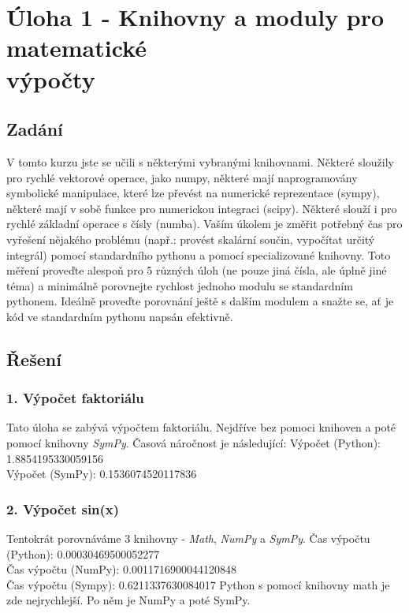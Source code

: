 \documentclass[a4paper,12pt]{article}
\begin{document}
	\section {Úloha 1 - Knihovny a moduly pro matematické\\ výpočty}
	\subsection{Zadání}
V tomto kurzu jste se učili s některými vybranými knihovnami. Některé sloužily pro rychlé vektorové operace, jako numpy, některé mají naprogramovány symbolické manipulace, které lze převést na numerické reprezentace (sympy), některé mají v sobě funkce pro numerickou integraci (scipy). Některé slouží i pro rychlé základní operace s čísly (numba).
\justify
Vaším úkolem je změřit potřebný čas pro vyřešení nějakého problému (např.: provést skalární součin, vypočítat určitý integrál) pomocí standardního pythonu a pomocí specializované knihovny. Toto měření proveďte alespoň pro 5 různých úloh (ne pouze jiná čísla, ale úplně jiné téma) a minimálně porovnejte rychlost jednoho modulu se standardním pythonem. Ideálně proveďte porovnání ještě s dalším modulem a snažte se, ať je kód ve standardním pythonu napsán efektivně.  



\subsection{Řešení}
\subsubsection{1. Výpočet faktoriálu}
Tato úloha se zabývá výpočtem faktoriálu. Nejdříve bez pomoci knihoven a poté pomocí
knihovny \textit{SymPy}. Časová náročnost je následující:
\justify
Výpočet (Python):  1.8854195330059156\\
Výpočet (SymPy):  0.1536074520117836
\\
\subsubsection{2. Výpočet sin(x)}
Tentokrát porovnáváme 3 knihovny - \textit{Math}, \textit{NumPy} a \textit{SymPy}.
\justify
Čas výpočtu (Python):  0.00030469500052277\\
Čas výpočtu (NumPy):   0.0011716900044120848\\
Čas výpočtu (Sympy):   0.6211337630084017
\justify
Python s pomocí knihovny math je zde nejrychlejší. Po něm je NumPy a poté SymPy.\\
\end{document}
